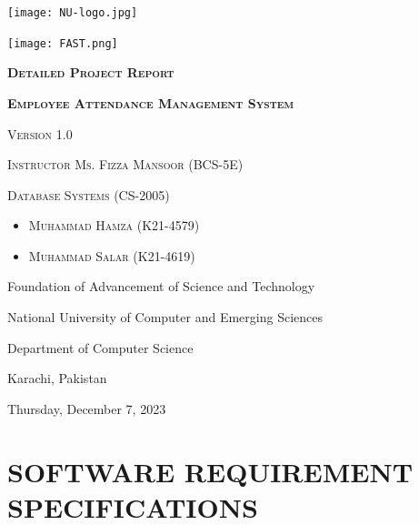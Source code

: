 \documentclass[a4paper, 12pt]{article}
\begin{document}
\begin{titlepage}
    \centering
    \vspace{3.5cm}
    \texttt{[image: NU-logo.jpg]}\par\vspace{1cm}
    \texttt{[image: FAST.png]}\par\vspace{1cm}
    \vspace{2cm}
    {\scshape\Large\textbf {Detailed Project Report} \par}
    \vspace{2cm}
    {\scshape\LARGE\textbf {Employee Attendance Management System} \par}
    \vspace{0.25cm}
    {\scshape\Large Version 1.0 \par}
    \vspace{2cm}
    {\scshape\Large Instructor Ms. Fizza Mansoor (BCS-5E) \par}
    \vspace{0.25cm}
    {\scshape\Large Database Systems (CS-2005) \par}
    \vspace{2cm}
    \begin{itemize}
    \item {\scshape\Large Muhammad Hamza (K21-4579) \par}
    \vspace{0.25cm}
    \item {\scshape\Large Muhammad Salar (K21-4619) \par}
    \end{itemize}
    \vfill
    \vspace{1cm}    
    {Foundation of Advancement of Science and Technology \par}
    {National University of Computer and Emerging Sciences \par}
    {Department of Computer Science \par}
    {Karachi, Pakistan \par}
    {Thursday, December 7, 2023 \par}
\end{titlepage}

\tableofcontents
\newpage

\section*{\centering SOFTWARE REQUIREMENT SPECIFICATIONS}
\end{document}
